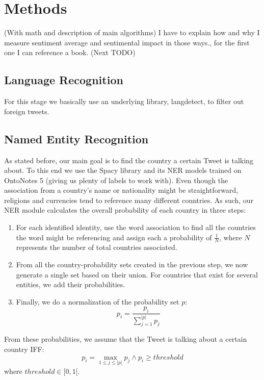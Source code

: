 \documentclass[11pt]{article}
\begin{document}
	\section{Methods}
	(With math and description of main algorithms)
	I have to explain how and why I measure sentiment average and sentimental impact
	in those ways., for the first one I can reference a book.
	(Next TODO)
	\subsection{Language Recognition}
	\label{sub:language_recognition}
	For this stage we basically use an underlying library, langdetect, to filter out foreign tweets.
	
	\subsection{Named Entity Recognition}
	\label{sub:named_entity_recognition}
	As stated before, our main goal is to find the country a certain Tweet is talking about. To this end we use the Spacy library and its NER models trained on OntoNotes 5 (giving us plenty of labels to work with). Even though the association from a country's name or nationality might be straightforward, religions and currencies tend to reference many different countries. As such, our NER module calculates the overall probability of each country in three steps:
	\begin{enumerate}
		\item For each identified identity, use the word association to find all the countries the word might be referencing and assign each a probability of $\frac{1}{N}$, where $N$ represents the number of total countries associated.
		\item From all the country-probability sets created in the previous step, we now generate a single set based on their union. For countries that exist for several entities, we add their probabilities.
		\item Finally, we do a normalization of the probability set $p$:
		\begin{equation}
		p_i = \frac{p_{i}}{\sum_{j=1}^{|p|} p_j}
		\end{equation}
	\end{enumerate}
	
	From these probabilities, we assume that the Tweet is talking about a certain country IFF:
	\begin{equation}
	p_{i} = \max_{1 \leq j \leq |p|} p_{j} \wedge p_{i} \ge threshold
	\end{equation}
	where $threshold \in [0, 1[$.
	
\end{document}
